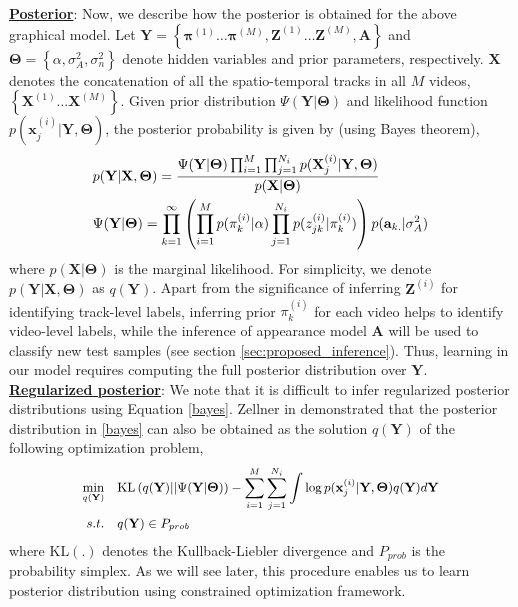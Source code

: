 \documentclass[runningheads]{llncs}
\begin{document}
\newline
\noindent
\underline{\bf Posterior}: Now, we describe how the posterior is obtained for the above graphical model. Let $\mathbf{Y} = \left\lbrace\mathbf{\pi}^{(1)}\dots\mathbf{\pi}^{(M)},\mathbf{Z}^{(1)}\dots\mathbf{Z}^{(M)},\mathbf{A}\right\rbrace$ and $\mathbf{\Theta} = \left\lbrace\alpha, \sigma_A^2,\sigma_n^2\right\rbrace$ denote hidden variables and prior parameters, respectively. $\mathbf{X}$ denotes the concatenation of all the spatio-temporal tracks in all $M$ videos, $\left\lbrace\mathbf{X}^{(1)}\dots\mathbf{X}^{(M)}\right\rbrace$. Given prior distribution $\Psi(\mathbf{Y} | \mathbf{\Theta})$ and likelihood function $p(\mathbf{x}^{(i)}_j | \mathbf{Y},\mathbf{\Theta})$, the posterior probability is given by (using Bayes theorem),
\begin{align}
\vspace{-2mm}
&p(\mathbf{Y} | \mathbf{X},\mathbf{\Theta}) = \frac{\Psi(\mathbf{Y} | \mathbf{\Theta}) \prod_{i=1}^M \prod_{j=1}^{N_i}p(\mathbf{X}^{(i)}_j | \mathbf{Y},\mathbf{\Theta})}{p(\mathbf{X} | \mathbf{\Theta})} \label{bayes} \\
&\Psi(\mathbf{Y} | \mathbf{\Theta}) = \prod_{k=1}^\infty \left(\prod_{i=1}^M  p(\pi_k^{(i)} | \alpha) \prod_{j=1}^{N_i} p(z_{jk}^{(i)} | \pi_k^{(i)} )\right) p(\mathbf{a}_{k.} | \sigma_A^2) \nonumber
\end{align}
where $p(\mathbf{X} | \mathbf{\Theta})$ is the marginal likelihood. For simplicity, we denote $p(\mathbf{Y} | \mathbf{X},\mathbf{\Theta})$ as $q(\mathbf{Y})$. Apart from the significance of inferring $\mathbf{Z}^{(i)}$ for identifying track-level labels, inferring prior $\pi_k^{(i)}$ for each video helps to identify video-level labels, while the inference of appearance model $\mathbf{A}$ will be used to classify new test samples (see section \ref{sec:proposed_inference}). Thus, learning in our model requires computing the full posterior distribution over $\mathbf{Y}$.
\newline
\noindent
\underline{\bf Regularized posterior}: We note that it is difficult to infer regularized posterior distributions using Equation \eqref{bayes}. Zellner in \cite{zellner1988optimal} demonstrated that the posterior distribution in \eqref{bayes} can also be obtained as the solution $q(\mathbf{Y})$ of the following optimization problem,
\begin{equation}{\small
\begin{aligned}
\label{eq3.5}
\min_{q(\mathbf{Y})} \quad &\text{KL}\left(q(\mathbf{Y}) || \Psi(\mathbf{Y}|\mathbf{\Theta})\right)
 - \sum_{i=1}^M \sum_{j=1}^{N_i} \int \log p(\mathbf{x}^{(i)}_j | \mathbf{Y}, \mathbf{\Theta}) q(\mathbf{Y}) d\mathbf{Y} \\
 \vspace{-4mm}
s.t. \quad &q(\mathbf{Y}) \in P_{prob}
\end{aligned}
}
\end{equation}
where $\text{KL}(.)$ denotes the Kullback-Liebler divergence and $P_{prob}$ is the probability simplex. As we will see later, this procedure enables us to learn posterior distribution using constrained optimization framework.
\end{document}

